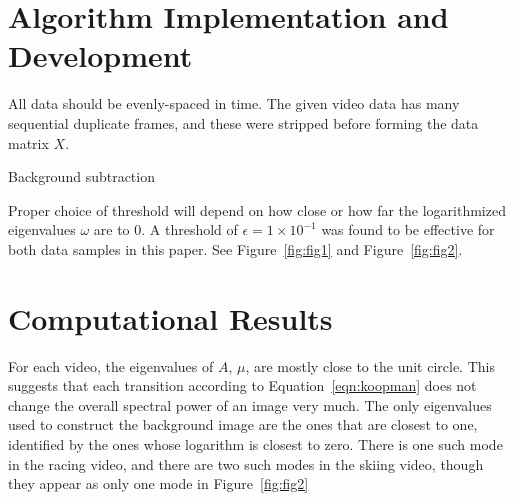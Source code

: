 \documentclass{article}
\begin{document}
\section{Algorithm Implementation and Development}

All data should be evenly-spaced in time. The given video data has many sequential duplicate frames, and these were stripped before forming the data matrix $X$.

\begin{algorithm}[!t]
	\begin{algorithmic}
		\ENDFOR{}
	\end{algorithmic}
	\label{alg:background}
	\caption{Background subtraction}
\end{algorithm}
	
Proper choice of threshold will depend on how close or how far the logarithmized eigenvalues $\omega$ are to $0$. A threshold of $\epsilon = 1\times 10^{-1}$ was found to be effective for both data samples in this paper. See Figure~\ref{fig:fig1} and Figure~\ref{fig:fig2}.

\section{Computational Results}

For each video, the eigenvalues of $A$, $\mu$, are mostly close to the unit circle. This suggests that each transition according to Equation~\ref{eqn:koopman} does not change the overall spectral power of an image very much. The only eigenvalues used to construct the background image are the ones that are closest to one, identified by the ones whose logarithm is closest to zero. There is one such mode in the racing video, and there are two such modes in the skiing video, though they appear as only one mode in Figure~\ref{fig:fig2}
\end{document}
